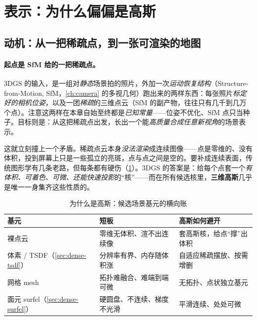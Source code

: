 \section{表示：为什么偏偏是高斯}
\label{sec:3dgs-repr}

\subsection{动机：从一把稀疏点，到一张可渲染的地图}

\paragraph{起点是 SfM 给的一把稀疏点。}
3DGS\cite{kerbl2023gaussian} 的输入，是一组对\emph{静态}场景拍的照片，外加一次\emph{运动恢复结构}（Structure-from-Motion, SfM，\cref{ch:camera} 的多视几何）跑出来的两样东西：每张照片\emph{标定好的相机位姿}，以及一团\emph{稀疏}的三维点云（SfM 的副产物，往往只有几千到几万个点）。注意这两样在本章自始至终都是\emph{已知常量}——位姿不优化、SfM 点只当种子。目标则是：从这把稀疏点出发，长出一个能\emph{高质量合成任意新视角}的场景表示。

这就立刻撞上一个矛盾。稀疏点云本身\emph{没法渲染}成连续图像——点是零维的、没有体积，投到屏幕上只是一些孤立的亮斑，点与点之间是空的。要补成连续表面，传统图形学有几条老路，但每条都有硬伤（\cref{tab:3dgs-why-gauss}）。3DGS 的答案是：给每个点套一个\emph{有体积、可着色、可微、还能快速投影}的“核”——而在所有候选核里，\textbf{三维高斯}几乎是唯一一身集齐这些性质的。

\begin{table}[H]\centering
\caption{为什么是高斯：候选场景基元的横向账}
\label{tab:3dgs-why-gauss}
\small
\begin{tabular}{@{}lll@{}}
\toprule
基元 & 短板 & 高斯如何避开 \\
\midrule
裸点云 & 零维无体积、渲不出连续像 & 套高斯核，给点“撑”出体积 \\
体素 / TSDF（\cref{sec:dense-tsdf}）& 分辨率有界、内存随体积涨 & 自适应稀疏摆放、按需增删 \\
网格 mesh & 拓扑难融合、难端到端可微 & 无拓扑、点状独立基元 \\
面元 surfel（\cref{sec:dense-surfel}）& 硬圆盘、不连续、梯度不光滑 & 平滑连续、处处可微 \\
\bottomrule
\end{tabular}
\end{table}

